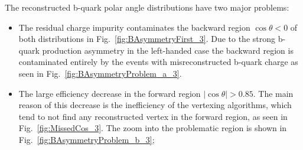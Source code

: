The reconstructed b-quark polar angle distributions have two major problems:
\begin{itemize}
	\item The residual charge impurity contaminates the backward region $\cos\theta < 0$ of both distributions in Fig.~\ref{fig:BAsymmetryFirst_3}. Due to the strong b-quark production asymmetry in the left-handed case the backward region is contaminated entirely by the events with misreconstructed b-quark charge as seen in Fig.~\ref{fig:BAsymmetryProblem_a_3}.
	\item The large efficiency decrease in the forward region $|\cos\theta| > 0.85$. The main reason of this decrease is the inefficiency of the vertexing algorithms, which tend to not find any reconstructed vertex in the forward region, as seen in Fig.~\ref{fig:MissedCos_3}. The zoom into the problematic region is shown in Fig.~\ref{fig:BAsymmetryProblem_b_3};

\end{itemize}


